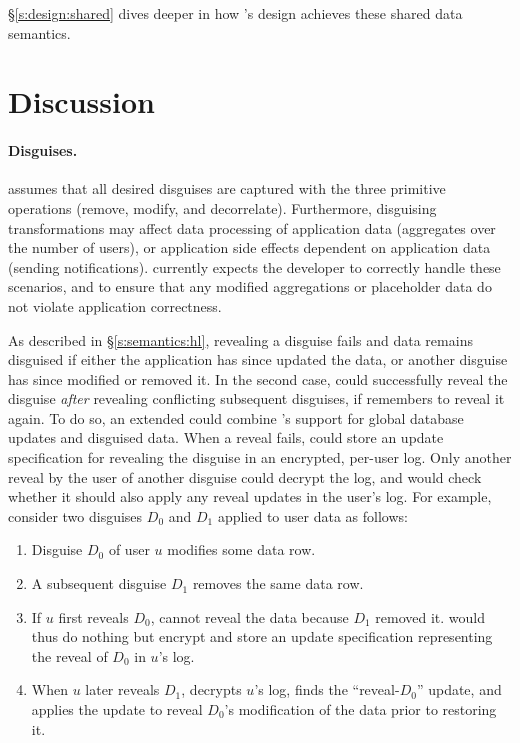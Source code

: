 \S\ref{s:design:shared} dives deeper in how \sys's design achieves these shared
data semantics.


\section{Discussion}

\paragraph{Disguises.}
\sys assumes that all desired disguises are captured with the three primitive
operations (remove, modify, and decorrelate).
%
Furthermore, disguising transformations may affect data processing of
application data (\eg aggregates over the number of users), or application side
effects dependent on application data (\eg sending notifications).  \sys
currently expects the developer to correctly handle these scenarios, and to ensure
that any modified aggregations or placeholder data do not violate application
correctness.
%

%
As described in \S\ref{s:semantics:hl}, revealing a disguise fails and data
remains disguised if either the application has since updated the data, or
another disguise has since modified or removed it.
%
In the second case, \sys could successfully reveal the disguise \emph{after}
revealing conflicting subsequent disguises, if \sys remembers to reveal
it again.
%
%
To do so, an extended \sys could combine \sys's support for global database
updates and disguised data. When a reveal fails, \sys could store an update
specification for revealing the disguise in an encrypted, per-user log. 
%
Only another reveal by the user of another disguise could decrypt the log, and
\sys would check whether it should also apply any reveal updates in the user's 
log.
%
For example, consider two disguises $D_0$ and $D_1$ applied to user data as
follows:
\begin{enumerate}[nosep]
    \item Disguise $D_0$ of user $u$ modifies some data row.
\item A subsequent disguise $D_1$ removes the same data row. 
\item If $u$ first reveals $D_0$, \sys cannot reveal the data because
        $D_1$ removed it. \sys would thus do nothing but encrypt and store an
        update specification representing the reveal of $D_0$ in $u$'s log.
    \item When $u$ later reveals $D_1$, \sys decrypts $u$'s log, finds the
        ``reveal-$D_0$'' update, and applies the update to reveal $D_0$'s
        modification of the data prior to restoring it.
\end{enumerate}

